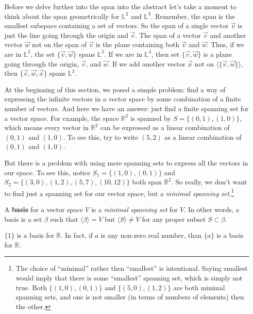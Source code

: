 Before we delve further into the span into the abstract let's take a moment to think about the span geometrically for $\mathbb{L}^2$ and $\mathbb{L}^3$. Remember, the span is the smallest subspace containing a set of vectors. So the span of a single vector $\vec{v}$ is just the line going through the origin and $\vec{v}$. The span of a vector $\vec{v}$ and another vector $\vec{w}$ not on the span of $\vec{v}$ is the plane containing both $\vec{v}$ and $\vec{w}$. Thus, if we are in $\mathbb{L}^2$, the set $\{\vec{v},\vec{w}\}$ spans $\mathbb{L}^2$. If we are in $\mathbb{L}^3$, then set $\{ \vec{v}, \vec{w} \}$ is a plane going through the origin, $\vec{v}$, and $\vec{w}$. If we add another vector $\vec{x}$ not on $\langle \{ \vec{v}, \vec{w} \} \rangle$, then $\{ \vec{v}, \vec{w}, \vec{x} \}$ spans $\mathbb{L}^3$.

At the beginning of this section, we posed a simple problem: find a way of expressing the infinite vectors in a vector space by some combination of a finite number of vectors. And here we have an answer: just find a finite spanning set for a vector space. For example, the space $\mathbb{R}^2$ is spanned by $S = \{ (0,1), (1,0) \}$, which means every vector in $\mathbb{R}^2$ can be expressed as a linear combination of $(0,1)$ and $(1,0)$. To see this, try to write $(5,2)$ as a linear combination of $(0,1)$ and $(1,0)$.

But there is a problem with using mere spanning sets to express all the vectors in our space. To see this, notice $S_1 = \{ (1,0), (0,1) \}$ and $S_2 = \{ (3,0), (1,2), (5,7), (10,12) \}$ both span $\mathbb{R}^2$. So really, we don't want to find just a spanning set for our vector space, but a \textit{minimal spanning set}.\footnote{The choice of ``minimal'' rather then ``smallest'' is intentional. Saying smallest would imply that there is some ``smallest'' spanning set, which is simply not true. Both $\{ (1,0), (0,1) \}$ and $\{(5,0), (1,2)\}$ are both minimal spanning sets, and one is not smaller (in terms of numbers of elements) then the other.}

\begin{definition}\label{def:basis}
	A \textbf{basis} for a vector space $V$ is a \textit{minimal spanning set} for $V$. In other words, a basis is a set $\beta$ such that $\langle \beta \rangle  = V$ but $\langle S \rangle \ne V$ for any proper subset $S \subset \beta$.
\end{definition}

\begin{example}
	$\{1\}$ is a basis for $\mathbb{R}$. In fact, if $a$ is any non-zero real number, than $\{a\}$ is a basis for $\mathbb{R}$.
\end{example}

